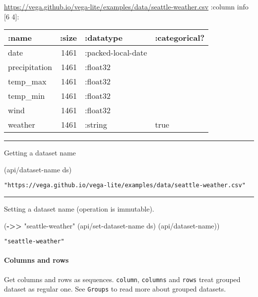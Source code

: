 \documentclass[]{article}
\newenvironment{Shaded}{\begin{snugshade}}{\end{snugshade}}
\newcommand{\KeywordTok}[1]{\textcolor[rgb]{0.13,0.29,0.53}{\textbf{#1}}}
\newcommand{\StringTok}[1]{\textcolor[rgb]{0.31,0.60,0.02}{#1}}
\newcommand{\NormalTok}[1]{#1}
\let\oldparagraph\paragraph
\renewcommand{\paragraph}[1]{\oldparagraph{#1}\mbox{}}
\begin{document}
\url{https://vega.github.io/vega-lite/examples/data/seattle-weather.csv}
:column info {[}6 4{]}:

\begin{longtable}[]{@{}lrll@{}}
\toprule
:name & :size & :datatype & :categorical?\tabularnewline
\midrule
\endhead
date & 1461 & :packed-local-date &\tabularnewline
precipitation & 1461 & :float32 &\tabularnewline
temp\_max & 1461 & :float32 &\tabularnewline
temp\_min & 1461 & :float32 &\tabularnewline
wind & 1461 & :float32 &\tabularnewline
weather & 1461 & :string & true\tabularnewline
\bottomrule
\end{longtable}

\begin{center}\rule{0.5\linewidth}{0.5pt}\end{center}

Getting a dataset name

\begin{Shaded}
\begin{Highlighting}[]
\NormalTok{(api/dataset-name ds)}
\end{Highlighting}
\end{Shaded}

\begin{verbatim}
"https://vega.github.io/vega-lite/examples/data/seattle-weather.csv"
\end{verbatim}

\begin{center}\rule{0.5\linewidth}{0.5pt}\end{center}

Setting a dataset name (operation is immutable).

\begin{Shaded}
\begin{Highlighting}[]
\NormalTok{(}\KeywordTok{->>} \StringTok{"seattle-weather"}
\NormalTok{     (api/set-dataset-name ds)}
\NormalTok{     (api/dataset-name))}
\end{Highlighting}
\end{Shaded}

\begin{verbatim}
"seattle-weather"
\end{verbatim}

\paragraph{Columns and rows}\label{columns-and-rows}

Get columns and rows as sequences. \texttt{column}, \texttt{columns} and
\texttt{rows} treat grouped dataset as regular one. See \texttt{Groups}
to read more about grouped datasets.
\end{document}
